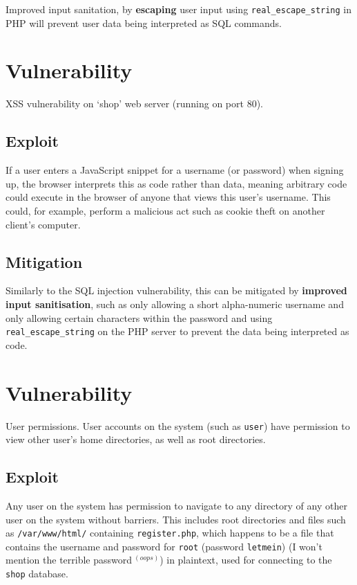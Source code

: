 \documentclass[11pt]{article}
\begin{document}
Improved input sanitation, by \textbf{escaping} user input using \texttt{real\_escape\_string} in PHP will prevent user data being interpreted as SQL commands.

\section{Vulnerability}

XSS vulnerability on `shop' web server (running on port 80).

\subsection{Exploit}

If a user enters a JavaScript snippet for a username (or password) when signing up, the browser interprets this as code rather than data, meaning arbitrary code could execute in the browser of anyone that views this user's username. This could, for example, perform a malicious act such as cookie theft on another client's computer.

\subsection{Mitigation}

Similarly to the SQL injection vulnerability, this can be mitigated by \textbf{improved input sanitisation}, such as only allowing a short alpha-numeric username and only allowing certain characters within the password and using \texttt{real\_escape\_string} on the PHP server to prevent the data being interpreted as code.

\section{Vulnerability}

User permissions. User accounts on the system (such as \texttt{user}) have permission to view other user's home directories, as well as root directories.

\subsection{Exploit}

Any user on the system has permission to navigate to any directory of any other user on the system without barriers. This includes root directories and files such as \texttt{/var/www/html/} containing \texttt{register.php}, which happens to be a file that contains the username and password for \texttt{root} (password \texttt{letmein}) (I won't mention the terrible password$\:^{(oops)}$) in plaintext, used for connecting to the \texttt{shop} database.
\end{document}
